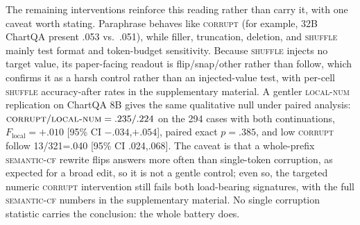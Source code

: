 \documentclass[11pt]{article}
\newcommand{\corrupt}{\textsc{corrupt}}
\newcommand{\shuffle}{\textsc{shuffle}}
\newcommand{\localnum}{\textsc{local-num}}
\newcommand{\semanticcf}{\textsc{semantic-cf}}
\begin{document}
The remaining interventions reinforce this reading rather than carry it, with one caveat worth stating. Paraphrase behaves like \corrupt{} (for example, 32B ChartQA present .053 vs.\ .051), while filler, truncation, deletion, and \shuffle{} mainly test format and token-budget sensitivity. Because \shuffle{} injects no target value, its paper-facing readout is flip/snap/other rather than follow, which confirms it as a harsh control rather than an injected-value test, with per-cell \shuffle{} accuracy-after rates in the supplementary material. A gentler \localnum{} replication on ChartQA 8B gives the same qualitative null under paired analysis: $\corrupt{}/\localnum{}=.235/.224$ on the 294 cases with both continuations, $F_{\mathrm{local}}=+.010$ [95\% CI $-.034$,$+.054$], paired exact $p=.385$, and low \corrupt{} follow 13/321=.040 [95\% CI .024,.068]. The caveat is that a whole-prefix \semanticcf{} rewrite flips answers more often than single-token corruption, as expected for a broad edit, so it is not a gentle control; even so, the targeted numeric \corrupt{} intervention still fails both load-bearing signatures, with the full \semanticcf{} numbers in the supplementary material. No single corruption statistic carries the conclusion: the whole battery does.
\end{document}
